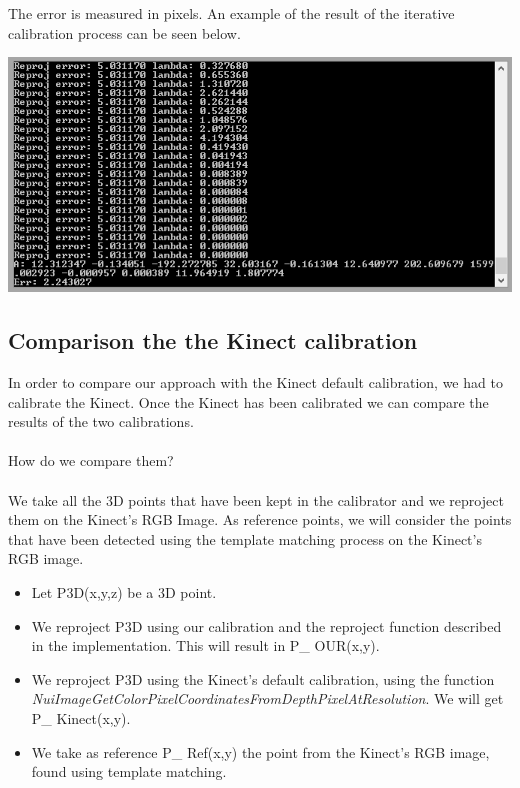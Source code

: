\noindent
The error is measured in pixels. An example of the result of the iterative calibration process can be seen below.

\begin{center}
	\includegraphics[scale=1]{images/webcam_calibration.png}
\end{center}

\subsection{Comparison the the Kinect calibration}
\noindent
In order to compare our approach with the Kinect default calibration, we had to calibrate the Kinect. Once the Kinect has been calibrated we can compare the results of the two calibrations.
\\\\
How do we compare them?
\\\\
We take all the 3D points that have been kept in the calibrator and we reproject them on the Kinect's RGB Image. As reference points, we will consider the points that have been detected using the template matching process on the Kinect's RGB image. 

\begin{itemize}
	\item Let P3D(x,y,z) be a 3D point.
	\item We reproject P3D using our calibration and the reproject function described in the implementation. This will result in P\_ OUR(x,y).
	\item We reproject P3D using the Kinect's default calibration, using the function \emph{NuiImageGetColorPixelCoordinatesFromDepthPixelAtResolution}. We will get P\_ Kinect(x,y).
	\item We take as reference P\_ Ref(x,y) the point from the Kinect's RGB image, found using template matching.
\end{itemize}


